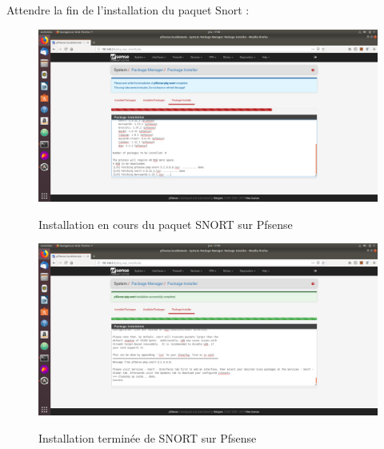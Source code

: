 Attendre la fin de l'installation du paquet Snort :
\begin{figure}[h!]
    \begin{center}
        \includegraphics[scale=0.33]{MISP_Screenshots/Snort/5.png}
        \label{MISP_Screenshots/Snort/5}
        \caption{Installation en cours du paquet SNORT sur Pfsense}
    \end{center}
\end{figure}
\FloatBarrier 
    

\begin{figure}[h!]
    \begin{center}
        \includegraphics[scale=0.33]{MISP_Screenshots/Snort/6.png}
        \label{MISP_Screenshots/Snort/6}
        \caption{Installation terminée de SNORT sur Pfsense}
    \end{center}
\end{figure}
\FloatBarrier 

